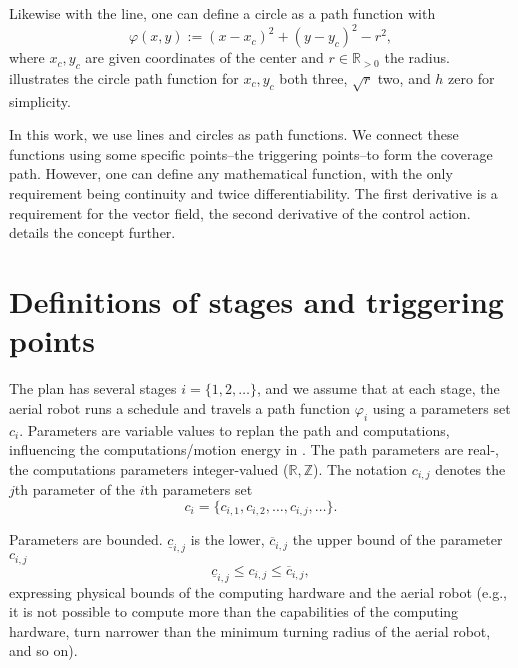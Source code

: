 Likewise with the line, one can define a circle as a path function with
\begin{equation}\label{eq:pathf-circle}
  \varphi(x,y):=(x-x_c)^2+(y-y_c)^2-r^2,
\end{equation}
where $x_c,y_c$ are given coordinates of the center and $r\in\mathbb{R}_{>0}$ the radius.  illustrates the circle path function for $x_c,y_c$ both three, $\sqrt{r}$ two, and $h$ zero for simplicity. 

In this work, we use lines and circles as path functions. We connect these functions using some specific points--the triggering points--to form the coverage path. However, one can define any mathematical function, with the only requirement being continuity and twice differentiability. The first derivative is a requirement for the vector field, the second derivative of the control action.  details the concept further.


\section{Definitions of stages and triggering points}
\label{sec:defs-stages-triggs}

The plan has several stages $i=\{1,2,\dots\}$, and we assume that at each stage, the aerial robot runs a schedule and travels a path function $\varphi_i$ using a parameters set $c_i$.
Parameters are variable values to replan the path and computations, influencing the computations/motion energy in . The path parameters are real-, the computations parameters integer-valued ($\mathbb{R},\mathbb{Z}$). The notation $c_{i,j}$ denotes the $j$th parameter of the $i$th parameters set
\begin{equation}
  c_i=\{c_{i,1},c_{i,2},\dots,c_{i,j},\dots\}.
\end{equation}

Parameters are bounded. $\underline{c}_{i,j}$ is the lower, $\overline{c}_{i,j}$ the upper bound of the parameter $c_{i,j}$
\begin{equation}
  \underline{c}_{i,j}\leq c_{i,j}\leq\overline{c}_{i,j},
\end{equation}
expressing physical bounds of the computing hardware and the aerial robot (e.g., it is not possible to compute more than the capabilities of the computing hardware, turn narrower than the minimum turning radius of the aerial robot, and so on).

